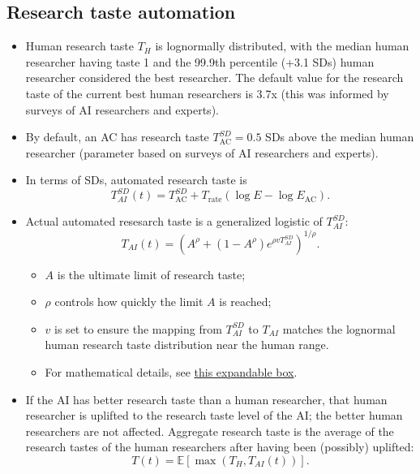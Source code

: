 \documentclass{article}
\theoremstyle{definition}
\begin{document}
\subsection{Research taste automation}

\begin{itemize}
\item Human research taste $T_H$ is lognormally distributed, with the median human researcher having taste 1 and the 99.9th percentile (+3.1 SDs) human researcher considered the best researcher. The default value for the research taste of the current best human researchers is 3.7x (this was informed by surveys of AI researchers and experts).
\item By default, an AC has research taste $T_{\text{AC}}^{SD} = 0.5$ SDs above the median human researcher (parameter based on surveys of AI researchers and experts).
\item In terms of SDs, automated research taste is
\[ T_{AI}^{SD}(t) = T_{\text{AC}}^{SD} + T_\text{rate} \left(\log E - \log E_{\text{AC}}\right).\]
\item Actual automated resesarch taste is a generalized logistic of $T_{AI}^{SD}$:
\[ T_{AI}(t) = \left(A^\rho + (1-A^\rho) e^{\rho v T_{AI}^{SD}} \right)^{1/\rho}.\]
\begin{itemize}
\item $A$ is the ultimate limit of research taste;
\item $\rho$ controls how quickly the limit $A$ is reached;
\item $v$ is set to ensure the mapping from $T_{AI}^{SD}$ to $T_{AI}$ matches the lognormal human research taste distribution near the human range.
\item For mathematical details, see \hyperref[Math details of automated research taste]{this expandable box}.
\end{itemize}
\item If the AI has better research taste than a human researcher, that human researcher is uplifted to the research taste level of the AI; the better human researchers are not affected. Aggregate research taste is the average of the research tastes of the human researchers after having been (possibly) uplifted:
\[ T(t) = \mathbb{E} \left[\max(T_H, T_{AI}(t))\right].\]


















\end{itemize}
\end{document}
